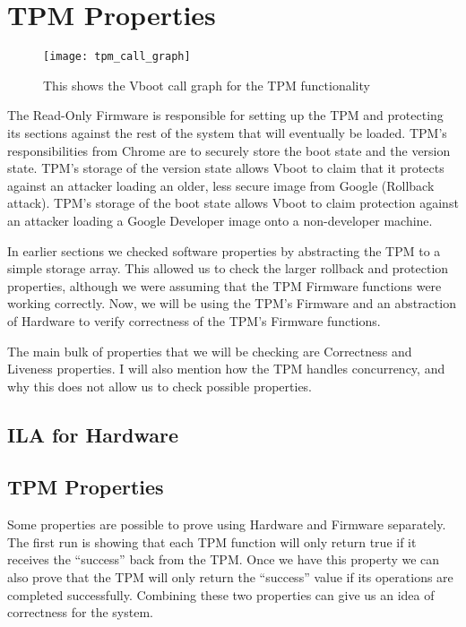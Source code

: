 \section{TPM Properties}

\begin{figure}[!htbp]
  \centering
  \texttt{[image: tpm\_call\_graph]}
  \caption[TPM Call Graph]{This shows the Vboot call graph for the TPM functionality}\label{fig:tpm_call_graph}
\end{figure}

The Read-Only Firmware is responsible for setting up the TPM and protecting its
sections against the rest of the system that will eventually be loaded.
TPM's responsibilities from Chrome are to securely store the boot state and the
version state.
TPM's storage of the version state allows Vboot to claim that it protects against 
an attacker loading an older, less secure image from Google (Rollback attack).
TPM's storage of the boot state allows Vboot to claim protection against an attacker loading a Google Developer image onto a non-developer machine.

In earlier sections we checked software properties by abstracting the TPM to a simple storage array. 
This allowed us to check the larger rollback and protection properties, although we were assuming that the TPM Firmware functions were working correctly.
Now, we will be using the TPM's Firmware and an abstraction of Hardware to verify correctness of the TPM's Firmware functions.

The main bulk of properties that we will be checking are Correctness and Liveness properties. 
I will also mention how the TPM handles concurrency, and why this does not allow us to check possible properties.


\subsection{ILA for Hardware}   

\subsection{TPM Properties}   

Some properties are possible to prove using Hardware and Firmware separately.
The first run is showing that each TPM function will only return true if it receives the ``success'' back from the TPM\@.
Once we have this property we can also prove that the TPM will only return the ``success'' value if its operations are completed successfully. 
Combining these two properties can give us an idea of correctness for the system.

